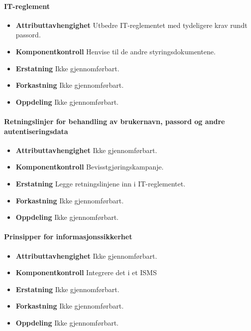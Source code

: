 \paragraph{IT-reglement}
\begin{itemize}
    \item \textbf{Attributtavhengighet} Utbedre IT-reglementet med tydeligere krav rundt passord. 
    \item \textbf{Komponentkontroll} Henvise til de andre styringsdokumentene.
    \item \textbf{Erstatning} Ikke gjennomførbart.
    \item \textbf{Forkastning} Ikke gjennomførbart.
    \item \textbf{Oppdeling} Ikke gjennomførbart.
\end{itemize}

\paragraph{Retningslinjer for behandling av brukernavn, passord og andre autentiseringsdata}
\begin{itemize}
    \item \textbf{Attributtavhengighet} Ikke gjennomførbart.
    \item \textbf{Komponentkontroll} Bevisstgjøringskampanje.
    \item \textbf{Erstatning} Legge retningslinjene inn i IT-reglementet.
    \item \textbf{Forkastning} Ikke gjennomførbart.
    \item \textbf{Oppdeling} Ikke gjennomførbart.
\end{itemize}

\paragraph{Prinsipper for informasjonssikkerhet}
\begin{itemize}
    \item \textbf{Attributtavhengighet} Ikke gjennomførbart.
    \item \textbf{Komponentkontroll} Integrere det i et ISMS
    \item \textbf{Erstatning} Ikke gjennomførbart.
    \item \textbf{Forkastning} Ikke gjennomførbart.
    \item \textbf{Oppdeling} Ikke gjennomførbart.
\end{itemize}

